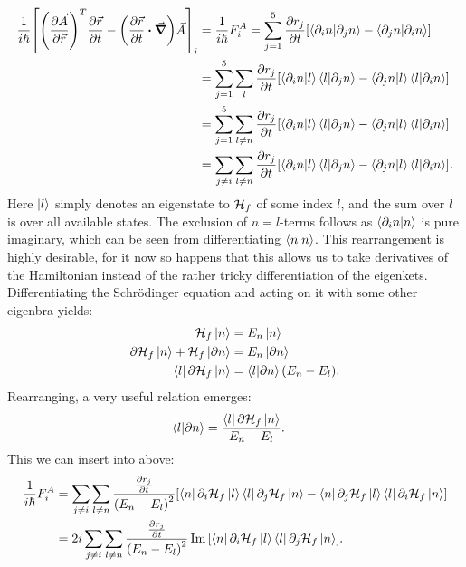 \documentclass[a4paper]{article}
\begin{document}
\begin{align*}
             \frac{1}{i\hbar{}}\bqty{\pqty{\frac{\partial \va{A}}{\partial \va{r}}}^T \frac{\partial
\va{r}}{\partial t} - \pqty{\frac{\partial \va{r}}{\partial t}  \vdot \grad}\va{A}}_i
 &= \frac{1}{i\hbar{}}F_{i}^A = \sum_{j=1}^{5} \frac{\partial
        r_j}{\partial t} \bqty{\bra{\partial_i n}\ket{\partial_j n}-\bra{\partial_j n}\ket{\partial_i
        n}}\\
        &= \sum_{j=1}^{5} \sum_{l} \frac{\partial r_j}{\partial t}\bqty{\bra{\partial_i
                n}\ket{l}\bra{l}\ket{\partial_j n}- \bra{\partial_j
        n}\ket{l}\bra{l}\ket{\partial_i n}}\\
        &= \sum_{j=1}^{5} \sum_{l \ne n} \frac{\partial r_j}{\partial t}\bqty{\bra{\partial_i
                n}\ket{l}\bra{l}\ket{\partial_j n}- \bra{\partial_j
        n}\ket{l}\bra{l}\ket{\partial_i n}}\\
        &= \sum_{j\ne i} \sum_{l \ne n} \frac{\partial r_j}{\partial t}\bqty{\bra{\partial_i
                n}\ket{l}\bra{l}\ket{\partial_j n}- \bra{\partial_j
        n}\ket{l}\bra{l}\ket{\partial_i n}}
.\end{align*}
Here \(\ket{l}\) simply denotes an eigenstate to \(\mathbb{\cal H}_{f}\) of some index
\(l\), and the sum over \(l\) is over all available states. The exclusion of \(n=l\)-terms follows as
\(\bra{\partial_i n}\ket{n}\) is pure imaginary, which can be seen from differentiating
\(\bra{n}\ket{n}\). This rearrangement is highly desirable, for it now so happens that this
allows us to take derivatives of the Hamiltonian instead of the rather tricky
differentiation of the eigenkets. Differentiating the Schrödinger equation and acting on it
with some other eigenbra yields:
\begin{align*}
        \mathbb{\cal H}_f \ket{n} &= E_n \ket{n}\\
        \partial \mathbb{\cal H}_f \ket{n} + \mathbb{\cal H}_f \ket{\partial n} &= E_n \ket{\partial n}\\
        \bra{l}\partial \mathbb{\cal H}_f \ket{n} &= \bra{l}\ket{\partial n}(E_n - E_l)
.\end{align*}
Rearranging, a very useful relation emerges:
\begin{align}\label{eq:Hdiff}
        \bra{l}\ket{\partial n} &= \frac{\bra{l}\partial \mathbb{\cal H}_f \ket{n}}{E_n
        - E_l}
.\end{align}
This we can insert into above:
\begin{align}\label{eq:FA}
\frac{1}{i\hbar{}}F_i^A &= \sum_{j\ne i} \sum_{l \ne n} \frac{\frac{\partial r_j}{\partial
        t}}{\pqty{E_n-E_l}^2}\bqty{\bra{n}\partial_i \mathbb{\cal H}_f
        \ket{l}\bra{l}\partial_j\mathbb{\cal H}_f\ket{n} - \bra{n}\partial_j \mathbb{\cal
        H}_f\ket{l}\bra{l}\partial_i \mathbb{\cal H}_f\ket{n}}\\
        &= 2i\sum_{j\ne i} \sum_{l \ne n} \frac{\frac{\partial r_j}{\partial
        t}}{\pqty{E_n-E_l}^2} \Im \bqty{\bra{n}\partial_i \mathbb{\cal H}_f
        \ket{l}\bra{l}\partial_j\mathbb{\cal H}_f\ket{n}}
.\end{align}
\end{document}
